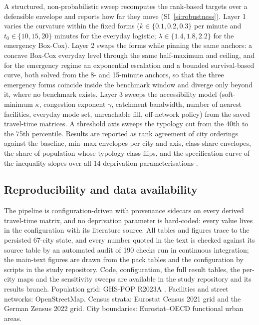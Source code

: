 \documentclass[11pt]{article}
\begin{document}
A structured, non-probabilistic sweep recomputes the rank-based targets
over a defensible envelope and reports how far they move
(SI~\ref{si:robustness}). Layer 1 varies the curvature within the fixed
forms ($k \in \{0.1, 0.2, 0.3\}$ per minute and $t_0 \in \{10, 15, 20\}$
minutes for the everyday logistic; $\lambda \in \{1.4, 1.8, 2.2\}$ for
the emergency Box-Cox). Layer 2 swaps the forms while pinning the same
anchors: a concave Box-Cox everyday level through the same half-maximum
and ceiling, and for the emergency regime an exponential escalation
\citep{holguinveras2013objective} and a bounded survival-based curve, both
solved from the 8- and 15-minute anchors, so that the three emergency
forms coincide inside the benchmark window and diverge only beyond it,
where no benchmark exists. Layer 3 sweeps the accessibility model
(soft-minimum $\kappa$, congestion exponent $\gamma$, catchment bandwidth,
number of nearest facilities, everyday mode set, unreachable fill,
off-network policy) from the saved travel-time matrices. A threshold axis
sweeps the typology cut from the 40th to the 75th percentile. Results are
reported as rank agreement of city orderings against the baseline,
min--max envelopes per city and axis, class-share envelopes, the share of
population whose typology class flips, and the specification curve of
the inequality slopes over all 14 deprivation parameterisations
\citep{simonsohn2020specification}.

\subsection{Reproducibility and data availability}\label{sec:m-repro}

The pipeline is configuration-driven with provenance sidecars on every
derived travel-time matrix, and no deprivation parameter is hard-coded:
every value lives in the configuration with its literature source. All
tables and figures trace to the persisted 67-city state, and every number
quoted in the text is checked against its source table by an automated
audit of 190 checks run in continuous integration; the main-text figures
are drawn from the pack tables and the configuration by scripts in the
study repository. Code, configuration, the full result tables, the
per-city maps and the sensitivity sweeps are available in the study
repository and its results branch. Population grid: GHS-POP R2023A
\citep{schiavina2023ghspop}. Facilities and street networks:
OpenStreetMap. Census strata: Eurostat Census 2021 grid and the German
Zensus 2022 grid. City boundaries: Eurostat--OECD functional urban areas.
\end{document}
